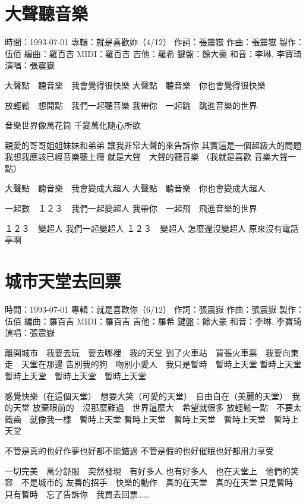 \documentclass[UTF8,a4paper,oneside,twocolumn,12pt]{ctexbook}
\newcommand{\infopair}[2]{\textbullet #1：#2}
\newcommand{\zc}[1][伍佰]{\infopair{作詞}{#1}}
\newcommand{\zq}[1][伍佰]{\infopair{作曲}{#1}}
\newcommand{\bq}[1][伍佰]{\infopair{編曲}{#1}}
\newcommand{\zj}[1]{\infopair{專輯}{#1}}
\newcommand{\zz}[1]{\infopair{製作}{#1}}
\newcommand{\sj}[1]{\infopair{時間}{#1}}
\newenvironment{info}{\begin{flushleft}\kaishu
	}
	{\end{flushleft}\normalsize\yahei\par}
\newenvironment{lyric}{
	}
{}
\begin{document}
\section{大聲聽音樂}
\begin{info}
	\sj{1993-07-01}
	\zj{就是喜歡妳（4/12）}
	\zc[張震嶽]
	\zq[張震嶽]
	\zz{伍佰}
	\bq[羅百吉]
	\infopair{MIDI}{羅百吉}
	\infopair{吉他}{羅希}
	\infopair{鍵盤}{餘大豪}
	\infopair{和音}{李琳, 李寶琦}
	\infopair{演唱}{張震嶽}
\end{info}
\begin{lyric}
	大聲點　聽音樂　我會覺得很快樂
	大聲點　聽音樂　你也會覺得很快樂

	放輕鬆　想開點　我們一起聽音樂
	我帶你　一起跳　跳進音樂的世界

	音樂世界像萬花筒
	千變萬化隨心所欲

	親愛的哥哥姐姐妹妹和弟弟
	讓我非常大聲的來告訴你
	其實這是一個超級大的問題
	我想我應該已經音樂聽上癮
	就是大聲　大聲的聽音樂
	（我就是喜歡 音樂大聲一點）

	大聲點　聽音樂　我會變成大超人
	大聲點　聽音樂　你也會變成大超人

	一起數　１２３　我們一起變超人
	我帶你　一起飛　飛進音樂的世界

	１２３　變超人 我們一起變超人
	１２３　變超人 怎麼還沒變超人 原來沒有電話亭啊
\end{lyric}

\section{城市天堂去回票}
\begin{info}
	\sj{1993-07-01}
	\zj{就是喜歡你（6/12）}
	\zc[張震嶽]
	\zq[張震嶽]
	\zz{伍佰}
	\bq[羅百吉]
	\infopair{MIDI}{羅百吉}
	\infopair{吉他}{羅希}
	\infopair{鍵盤}{餘大豪}
	\infopair{和音}{李琳, 李寶琦}
	\infopair{演唱}{張震嶽}
\end{info}
\begin{lyric}
	離開城市　我要去玩　要去哪裡　我的天堂
	到了火車站　買張火車票　我要向東走　天堂在那邊
	告別我的狗　吻別小愛人　我只是暫時　暫時上天堂
	暫時上天堂　暫時上天堂　暫時上天堂　暫時上天堂

	感覺快樂（在這個天堂）　想要大笑（可愛的天堂）　自由自在（美麗的天堂）　我的天堂
	放棄眼前的　沒那麼難過　世界這麼大　希望就很多
	放輕鬆一點　不要太鐵齒　就像我一樣　暫時上天堂
	暫時上天堂　暫時上天堂　暫時上天堂　暫時上天堂

	不管是真的也好作夢也好都不能錯過
	不管是假的也好催眠也好都用力享受

	一切完美　萬分舒服　突然發現　有好多人
	也有好多人　也在天堂上　他們的笑容　不是城市的
	友善的招手　快樂的動作　真的在天堂　真的在天堂
	只是暫時　只有暫時　忘了告訴你　我買去回票……
\end{lyric}
\end{document}
